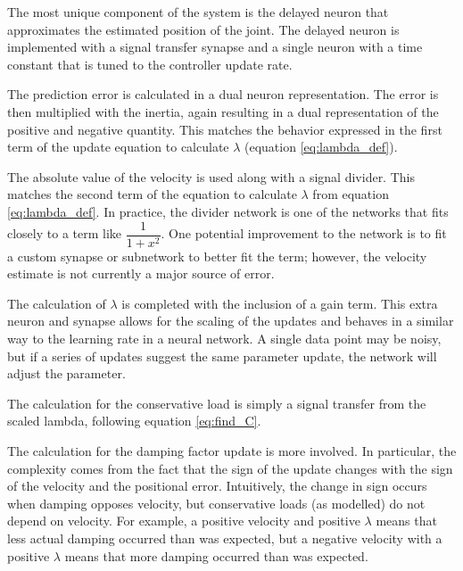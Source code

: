 

The most unique component of the system is the delayed neuron that approximates
the estimated position of the joint. The delayed neuron is implemented with a signal transfer
synapse and a single neuron with a time constant that is tuned to the controller
update rate.


The prediction error is calculated in a dual neuron representation. The
error is then multiplied with the inertia, again resulting in a dual 
representation of the positive and negative quantity. This matches the behavior
expressed in the first term of the update equation to calculate $\lambda$ (equation \ref{eq:lambda_def}).


The absolute value of the velocity is used along with a signal divider. This
matches the second term of the equation to calculate $\lambda$ from equation \ref{eq:lambda_def}. In practice,
the divider network is one of the networks that fits closely to a term like
$\dfrac{1}{1 + x^{2}}$. One potential improvement to the network is to fit
a custom synapse or subnetwork to better fit the term; however, the velocity estimate is not
currently a major source of error.


The calculation of $\lambda$ is completed with the inclusion of a gain term. This extra neuron and synapse
allows for the scaling of the updates and behaves in a similar way to the 
learning rate in a neural network. A single data point may be noisy, but if a 
series of updates suggest the same parameter update, the network will adjust the
parameter.


The calculation for the conservative load is simply a signal transfer from the scaled lambda, following equation \ref{eq:find_C}.


The calculation for the damping factor update is more involved. In particular,
the complexity comes from the fact that the sign of the update changes with the
sign of the velocity and the positional error. Intuitively, the change in sign occurs when
damping opposes velocity, but conservative loads (as modelled) do not depend on
velocity. For example, a positive velocity and positive $\lambda$ means that 
less actual damping occurred than was expected, but a negative velocity with a 
positive $\lambda$ means that more damping occurred than was expected.

